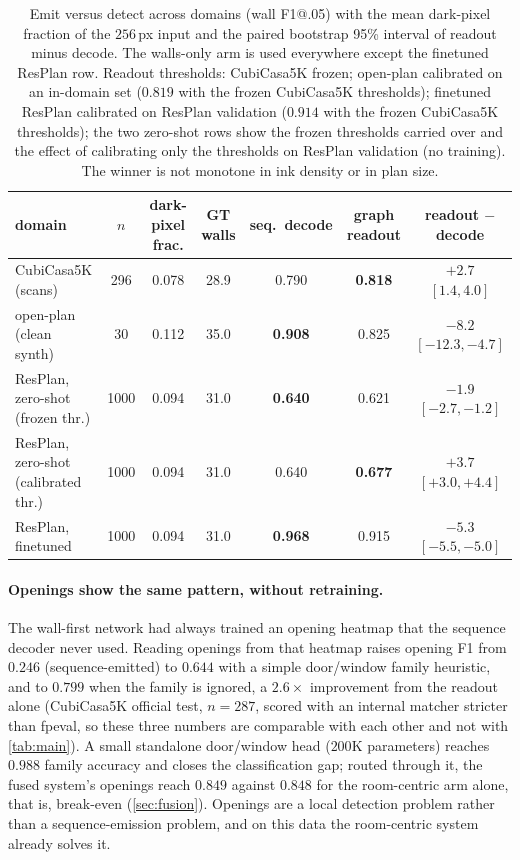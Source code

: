 \documentclass{article}
\newcommand{\tbf}[1]{\textbf{#1}}
\begin{document}
\begin{table}[t]
\centering
\caption{Emit versus detect across domains (wall F1@.05) with the mean
dark-pixel fraction of the $256$\,px input and the paired bootstrap 95\%
interval of readout minus decode. The walls-only arm is used everywhere except
the finetuned ResPlan row. Readout thresholds: CubiCasa5K frozen; open-plan calibrated on an in-domain set
($0.819$ with the frozen CubiCasa5K thresholds); finetuned ResPlan calibrated on
ResPlan validation ($0.914$ with the frozen CubiCasa5K thresholds); the two
zero-shot rows show the frozen thresholds carried over and the effect of
calibrating only the thresholds on ResPlan validation (no training). The
winner is not monotone in ink density or in plan size.}
\label{tab:crossover}
\small
\setlength{\tabcolsep}{4.5pt}
\begin{tabular}{lcccccc}
\toprule
domain & $n$ & dark-pixel frac. & GT walls & seq.\ decode & graph readout & readout $-$ decode \\
\midrule
CubiCasa5K (scans)              & 296  & 0.078 & 28.9 & 0.790 & \tbf{0.818} & $+2.7$ $[1.4,4.0]$ \\
open-plan (clean synth)        & 30   & 0.112 & 35.0 & \tbf{0.908} & 0.825 & $-8.2$ $[-12.3,-4.7]$ \\
ResPlan, zero-shot (frozen thr.)      & 1000 & 0.094 & 31.0 & \tbf{0.640} & 0.621 & $-1.9$ $[-2.7,-1.2]$ \\
ResPlan, zero-shot (calibrated thr.)  & 1000 & 0.094 & 31.0 & 0.640 & \tbf{0.677} & $+3.7$ $[+3.0,+4.4]$ \\
ResPlan, finetuned             & 1000 & 0.094 & 31.0 & \tbf{0.968} & 0.915 & $-5.3$ $[-5.5,-5.0]$ \\
\bottomrule
\end{tabular}
\end{table}

\paragraph{Openings show the same pattern, without retraining.} The wall-first
network had always trained an opening heatmap that the sequence decoder never
used. Reading openings from that heatmap raises opening F1 from $0.246$
(sequence-emitted) to $0.644$ with a simple door/window family heuristic, and
to $0.799$ when the family is ignored, a $2.6\times$ improvement from the
readout alone (CubiCasa5K official test, $n=287$, scored with an internal matcher
stricter than fpeval, so these three numbers are comparable with each other
and not with \cref{tab:main}). A small standalone door/window
head ($200$K parameters) reaches $0.988$ family accuracy and closes the
classification gap; routed through it, the fused system's openings reach
$0.849$ against $0.848$ for the room-centric arm alone, that is, break-even
(\cref{sec:fusion}). Openings are a local detection problem
rather than a sequence-emission problem, and on this data the room-centric
system already solves it.
\end{document}
